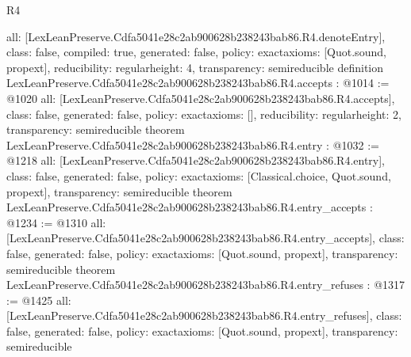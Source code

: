 \begin{lexlean}{R4}
\begin{coremodule}
{  all: [LexLeanPreserve.Cdfa5041e28c2ab900628b238243bab86.R4.denoteEntry],
  class: false,
  compiled: true,
  generated: false,
  policy: exact{axioms: [Quot.sound, propext]},
  reducibility: regular{height: 4},
  transparency: semireducible
}
definition LexLeanPreserve.Cdfa5041e28c2ab900628b238243bab86.R4.accepts : @1014 := @1020 {
  all: [LexLeanPreserve.Cdfa5041e28c2ab900628b238243bab86.R4.accepts],
  class: false,
  generated: false,
  policy: exact{axioms: []},
  reducibility: regular{height: 2},
  transparency: semireducible
}
theorem LexLeanPreserve.Cdfa5041e28c2ab900628b238243bab86.R4.entry : @1032 := @1218 {
  all: [LexLeanPreserve.Cdfa5041e28c2ab900628b238243bab86.R4.entry],
  class: false,
  generated: false,
  policy: exact{axioms: [Classical.choice, Quot.sound, propext]},
  transparency: semireducible
}
theorem LexLeanPreserve.Cdfa5041e28c2ab900628b238243bab86.R4.entry_accepts : @1234 := @1310 {
  all: [LexLeanPreserve.Cdfa5041e28c2ab900628b238243bab86.R4.entry_accepts],
  class: false,
  generated: false,
  policy: exact{axioms: [Quot.sound, propext]},
  transparency: semireducible
}
theorem LexLeanPreserve.Cdfa5041e28c2ab900628b238243bab86.R4.entry_refuses : @1317 := @1425 {
  all: [LexLeanPreserve.Cdfa5041e28c2ab900628b238243bab86.R4.entry_refuses],
  class: false,
  generated: false,
  policy: exact{axioms: [Quot.sound, propext]},
  transparency: semireducible
}


\end{coremodule}
\end{lexlean}
